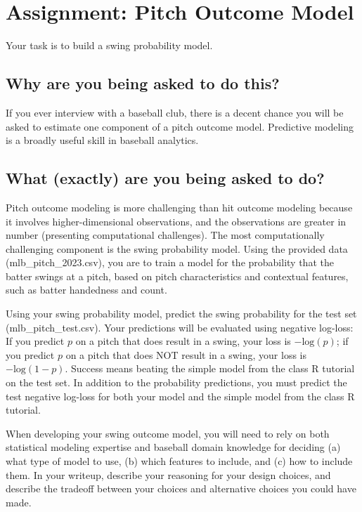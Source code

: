 \documentclass{article}
\begin{document}
  \section*{\sc Assignment: Pitch Outcome Model}

    Your task is to build a swing probability model.

    \subsection*{\sc Why are you being asked to do this?}

      If you ever interview with a baseball club, there is a decent chance you will be asked to estimate one component of a pitch outcome model. Predictive modeling is a broadly useful skill in baseball analytics.

    \subsection*{\sc What (exactly) are you being asked to do?}

      Pitch outcome modeling is more challenging than hit outcome modeling because it involves higher-dimensional observations, and the observations are greater in number (presenting computational challenges). The most computationally challenging component is the swing probability model. Using the provided data (mlb\_pitch\_2023.csv), you are to train a model for the probability that the batter swings at a pitch, based on pitch characteristics and contextual features, such as batter handedness and count.
      
      Using your swing probability model, predict the swing probability for the test set (mlb\_pitch\_test.csv). Your predictions will be evaluated using negative log-loss: If you predict $p$ on a pitch that does result in a swing, your loss is $-\mbox{log}(p)$; if you predict $p$ on a pitch that does NOT result in a swing, your loss is $-\mbox{log}(1 - p)$. Success means beating the simple model from the class R tutorial on the test set. In addition to the probability predictions, you must predict the test negative log-loss for both your model and the simple model from the class R tutorial.

      When developing your swing outcome model, you will need to rely on both statistical modeling expertise and baseball domain knowledge for deciding (a) what type of model to use, (b) which features to include, and (c) how to include them. In your writeup, describe your reasoning for your design choices, and describe the tradeoff between your choices and alternative choices you could have made.
\end{document}
